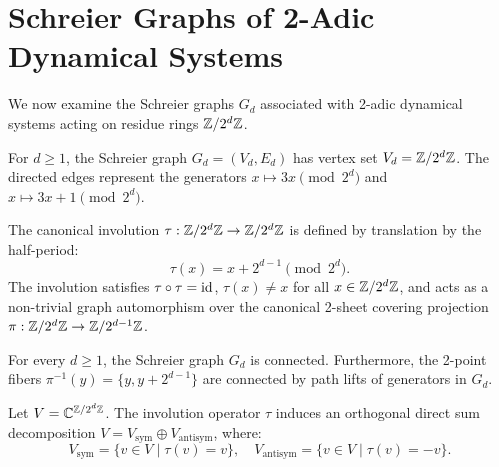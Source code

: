 \section{Schreier Graphs of 2-Adic Dynamical Systems}

We now examine the Schreier graphs $G_d$ associated with 2-adic dynamical systems acting on residue rings $\mathbb{Z} / 2^d \mathbb{Z}$.

\begin{definition}
\label{def:schreier_graph_gd}
\leanok
For $d \ge 1$, the Schreier graph $G_d = (V_d, E_d)$ has vertex set $V_d = \mathbb{Z} / 2^d \mathbb{Z}$. The directed edges represent the generators $x \mapsto 3x \pmod{2^d}$ and $x \mapsto 3x + 1 \pmod{2^d}$.
\end{definition}

\begin{definition}
\label{def:schreier_tau}
\leanok
The canonical involution $\tau : \mathbb{Z} / 2^d \mathbb{Z} \to \mathbb{Z} / 2^d \mathbb{Z}$ is defined by translation by the half-period:
\[
\tau(x) = x + 2^{d-1} \pmod{2^d}.
\]
The involution satisfies $\tau \circ \tau = \mathrm{id}$, $\tau(x) \neq x$ for all $x \in \mathbb{Z}/2^d\mathbb{Z}$, and acts as a non-trivial graph automorphism over the canonical 2-sheet covering projection $\pi : \mathbb{Z}/2^d\mathbb{Z} \to \mathbb{Z}/2^{d-1}\mathbb{Z}$.
\end{definition}

\begin{theorem}
\label{thm:schreier_connectedness}
\leanok
For every $d \ge 1$, the Schreier graph $G_d$ is connected. Furthermore, the 2-point fibers $\pi^{-1}(y) = \{y, y + 2^{d-1}\}$ are connected by path lifts of generators in $G_d$.
\end{theorem}

\begin{definition}
\label{def:schreier_sheet_split}
\leanok
Let $V = \mathbb{C}^{\mathbb{Z} / 2^d \mathbb{Z}}$. The involution operator $\tau$ induces an orthogonal direct sum decomposition $V = V_{\mathrm{sym}} \oplus V_{\mathrm{antisym}}$, where:
\[
V_{\mathrm{sym}} = \{ v \in V \mid \tau(v) = v \}, \quad V_{\mathrm{antisym}} = \{ v \in V \mid \tau(v) = -v \}.
\]
\end{definition}

